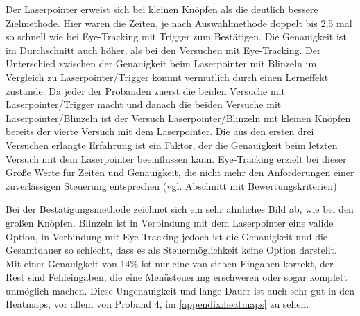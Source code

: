 Der Laserpointer erweist sich bei kleinen Knöpfen als die deutlich bessere Zielmethode. Hier waren die Zeiten, je nach Auswahlmethode doppelt bis 2,5 mal so schnell wie bei Eye-Tracking mit Trigger zum Bestätigen. Die Genauigkeit ist im Durchschnitt auch höher, als bei den Versuchen mit Eye-Tracking. Der Unterschied zwischen der Genauigkeit beim Laserpointer mit Blinzeln im Vergleich zu Laserpointer/Trigger kommt vermutlich durch einen Lerneffekt zustande. Da jeder der Probanden zuerst die beiden Versuche mit Laserpointer/Trigger macht und danach die beiden Versuche mit Laserpointer/Blinzeln ist der Versuch Laserpointer/Blinzeln mit kleinen Knöpfen bereits der vierte Versuch mit dem Laserpointer. Die aus den ersten drei Versuchen erlangte Erfahrung ist ein Faktor, der die Genauigkeit beim letzten Versuch mit dem Laserpointer beeinflussen kann. Eye-Tracking erzielt bei dieser Größe Werte für Zeiten und Genauigkeit, die nicht mehr den Anforderungen einer zuverlässigen Steuerung entsprechen (vgl. Abschnitt mit Bewertungskriterien)

Bei der Bestätigungsmethode zeichnet sich ein sehr ähnliches Bild ab, wie bei den großen Knöpfen. Blinzeln ist in Verbindung mit dem Laserpointer eine valide Option, in Verbindung mit Eye-Tracking jedoch ist die Genauigkeit und die Gesamtdauer so schlecht, dass es als Steuermöglichkeit keine Option darstellt. Mit einer Genauigkeit von 14\% ist nur eine von sieben Eingaben korrekt, der Rest sind Fehleingaben, die eine Menüsteuerung erschweren oder sogar komplett unmöglich machen. Diese Ungenauigkeit und lange Dauer ist auch sehr gut in den Heatmaps, vor allem von Proband 4, im \autoref{appendix:heatmaps}  zu sehen.

